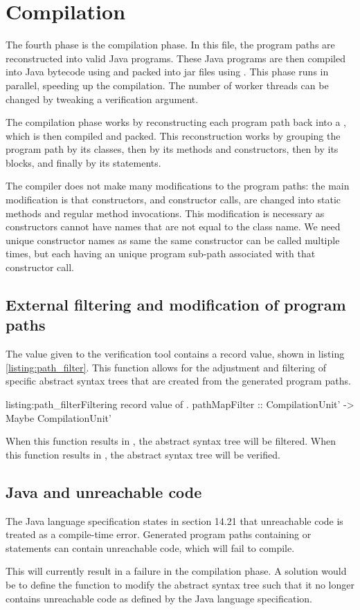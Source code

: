 \section{Compilation}
The fourth phase is the compilation phase. In this file, the program paths are
reconstructed into valid Java programs. These Java programs are then compiled into
Java bytecode using  and packed into jar files using .
This phase runs in parallel, speeding up the compilation. The number of worker
threads can be changed by tweaking a verification argument.

The compilation phase works by reconstructing each program path back into a 
, which is then compiled and packed. This
reconstruction works by grouping the program path by its classes, then by its 
methods and constructors, then by its blocks, and finally by its statements.

The compiler does not make many modifications to the program paths: the main
modification is that constructors, and constructor calls, are changed into 
static methods and regular method invocations. This modification is necessary as
constructors cannot have names that are not equal to the class name. We need
unique constructor names as same the same constructor can be called multiple times,
but each having an unique program sub-path associated with that constructor call.

\subsection{External filtering and modification of program paths}
The  value given to the verification tool contains a
record value, shown in listing \ref{listing:path_filter}. This function allows 
for the adjustment and filtering of specific abstract syntax trees that are
created from the generated program paths.
\begin{Haskell}{listing:path_filter}{Filtering record value of .}
pathMapFilter :: CompilationUnit' -> Maybe CompilationUnit'
\end{Haskell}
When this function results in , the abstract syntax tree 
will be filtered. When this function results in , the 
abstract syntax tree  will be verified.

\subsection{Java and unreachable code}
The Java language specification \cite{Gosling:2014:JLS:2636997} states in section
14.21 that unreachable code is treated as a compile-time error. Generated program 
paths containing  or  statements can contain 
unreachable code, which will fail to compile. 

This will currently result in a failure in the compilation phase. A solution would
be to define the  function to modify the abstract 
syntax tree such that it no longer contains unreachable code as defined by the
Java language specification.